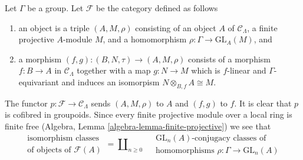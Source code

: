 \begin{example}
\label{example-representations}
Let $\Gamma$ be a group.
Let $\mathcal{F}$ be the category defined as follows
\begin{enumerate}
\item an object is a triple $(A, M, \rho)$ consisting of an
object $A$ of $\mathcal{C}_\Lambda$, a finite projective $A$-module $M$,
and a homomorphism $\rho : \Gamma \to \text{GL}_A(M)$, and
\item a morphism $(f, g) : (B, N, \tau) \to (A, M, \rho)$ consists of
a morphism $f : B \to A$ in $\mathcal{C}_\Lambda$ together
with a map $g : N \to M$ which is $f$-linear and $\Gamma$-equivariant
and induces an isomorpism $N \otimes_{B, f} A \cong M$.
\end{enumerate}
The functor $p : \mathcal{F} \to \mathcal{C}_\Lambda$ sends $(A, M, \rho)$
to $A$ and $(f, g)$ to $f$. It is clear that $p$ is cofibred in groupoids.
Since every finite projective module over a local ring is finite free
(Algebra, Lemma \ref{algebra-lemma-finite-projective})
we see that
$$
\begin{matrix}
\text{isomorphism classes} \\
\text{of objects of }\mathcal{F}(A)
\end{matrix}
=
\coprod\nolimits_{n \geq 0}\quad
\begin{matrix}
\text{GL}_n(A)\text{-conjugacy classes of}\\
\text{homomorphisms }\rho : \Gamma \to \text{GL}_n(A)
\end{matrix}
$$
\end{example}

